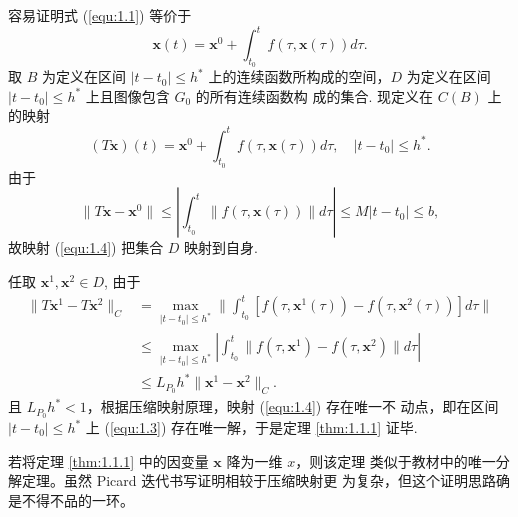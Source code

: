 \begin{pf1}
容易证明式 (\ref{equ:1.1}) 等价于
\begin{equation}\label{equ:1.3}
    \bm{x}(t)=\bm{x}^0+\int_{t_0}^tf(\tau,\bm{x}(\tau))d\tau.
\end{equation}
取 $B$ 为定义在区间 $|t-t_0|\leq h^*$ 上的连续函数所构成的空间，$D$
为定义在区间 $|t-t_0|\leq h^*$ 上且图像包含 $G_0$ 的所有连续函数构
成的集合. 现定义在 $C(B)$ 上的映射
\begin{equation}\label{equ:1.4}
    (T\bm{x})(t)=\bm{x}^0+\int_{t_0}^tf(\tau,\bm{x}(\tau))d\tau,\quad |t-t_0|\leq h^*.
\end{equation}
由于
\[
\|T\bm{x}-\bm{x}^0\|\leq\left|\int_{t_0}^t\|f(\tau,\bm{x}(\tau))\|d\tau\right|\leq M|t-t_0|\leq b,
\]
故映射 (\ref{equ:1.4}) 把集合 $D$ 映射到自身. 

任取 $\bm{x}^1,\bm{x}^2\in D$, 由于
\[
\begin{array}{rl}
    \|T\bm{x}^1-T\bm{x}^2\|_C&=\max\limits_{|t-t_0|\leq h^*}\|\int_{t_0}^{t}\left[f(\tau,\bm{x}^1(\tau))-f(\tau,\bm{x}^2(\tau))\right]d\tau\|\\
    & \leq \max\limits_{|t-t_0|\leq h^*}\left|\int_{t_0}^t\|f(\tau,\bm{x}^1)-f(\tau,\bm{x}^2)\|d\tau\right|\\
    & \leq L_{P_0}h^*\|\bm{x}^1-\bm{x}^2\|_C.
\end{array}
\]
且 $L_{P_0}h^*<1$，根据压缩映射原理，映射 (\ref{equ:1.4}) 存在唯一不
动点，即在区间 $|t-t_0|\leq h^*$ 上 (\ref{equ:1.3}) 存在唯一解，于是定理
\ref{thm:1.1.1} 证毕.
\end{pf1}

若将定理 \ref{thm:1.1.1} 中的因变量 $\bm{x}$ 降为一维 $x$，则该定理
类似于教材中的唯一分解定理。虽然 Picard 迭代书写证明相较于压缩映射更
为复杂，但这个证明思路确是不得不品的一环。

